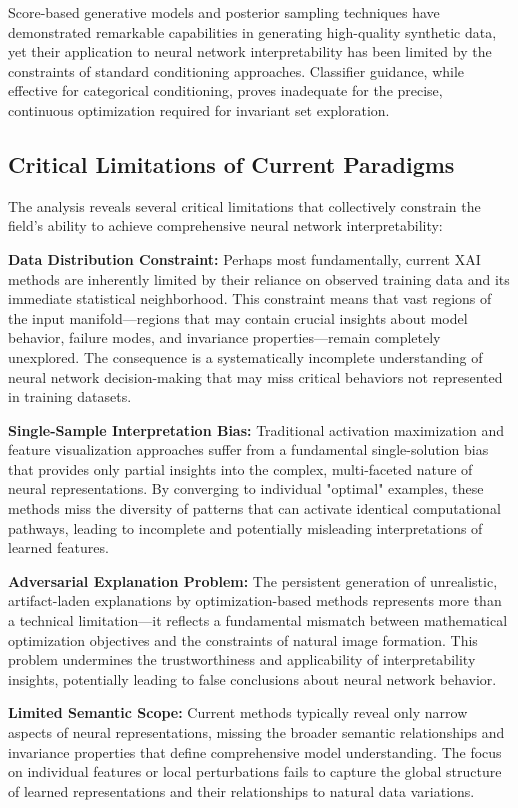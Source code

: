 \documentclass[licencjacka,en]{pracamgr}
\begin{document}
Score-based generative models and posterior sampling techniques have demonstrated remarkable capabilities in generating high-quality synthetic data, yet their application to neural network interpretability has been limited by the constraints of standard conditioning approaches. Classifier guidance, while effective for categorical conditioning, proves inadequate for the precise, continuous optimization required for invariant set exploration.

\subsection{Critical Limitations of Current Paradigms}

The analysis reveals several critical limitations that collectively constrain the field's ability to achieve comprehensive neural network interpretability:

\textbf{Data Distribution Constraint:} Perhaps most fundamentally, current XAI methods are inherently limited by their reliance on observed training data and its immediate statistical neighborhood. This constraint means that vast regions of the input manifold—regions that may contain crucial insights about model behavior, failure modes, and invariance properties—remain completely unexplored. The consequence is a systematically incomplete understanding of neural network decision-making that may miss critical behaviors not represented in training datasets.

\textbf{Single-Sample Interpretation Bias:} Traditional activation maximization and feature visualization approaches suffer from a fundamental single-solution bias that provides only partial insights into the complex, multi-faceted nature of neural representations. By converging to individual "optimal" examples, these methods miss the diversity of patterns that can activate identical computational pathways, leading to incomplete and potentially misleading interpretations of learned features.

\textbf{Adversarial Explanation Problem:} The persistent generation of unrealistic, artifact-laden explanations by optimization-based methods represents more than a technical limitation—it reflects a fundamental mismatch between mathematical optimization objectives and the constraints of natural image formation. This problem undermines the trustworthiness and applicability of interpretability insights, potentially leading to false conclusions about neural network behavior.

\textbf{Limited Semantic Scope:} Current methods typically reveal only narrow aspects of neural representations, missing the broader semantic relationships and invariance properties that define comprehensive model understanding. The focus on individual features or local perturbations fails to capture the global structure of learned representations and their relationships to natural data variations.
\end{document}
